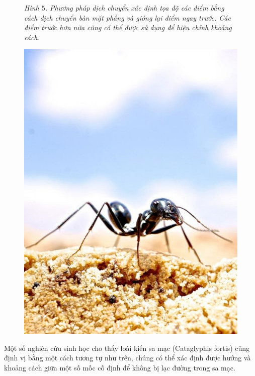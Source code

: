 \begin{multicols}{2}
\begin{figure}[H]
		\caption{\small\textit{\color{toanhocdoisong}Hình $5$. Phương pháp dịch chuyển xác định tọa độ các điểm bằng cách dịch chuyển bàn mặt phẳng và gióng lại điểm ngay trước. Các điểm trước hơn nữa cũng có thể được sử dụng để hiệu chỉnh khoảng cách.}}
		\vspace*{-10pt}
	\end{figure}
	\vskip 0.1cm
	\begin{tBox}
		\begin{figure}
			\vspace*{-15pt}
			\centering
			\captionsetup{labelformat= empty, justification=centering}
			\includegraphics[width= 1\linewidth]{9}
			\vspace*{-20pt}
		\end{figure}	
		Một số nghiên cứu sinh học cho thấy loài kiến sa mạc (Cataglyphis fortis) cũng định vị bằng một cách tương tự như trên, chúng có thể xác định được hướng và khoảng cách giữa một số mốc cố định để không bị lạc đường trong sa mạc.

\end{tBox}
\end{multicols}
